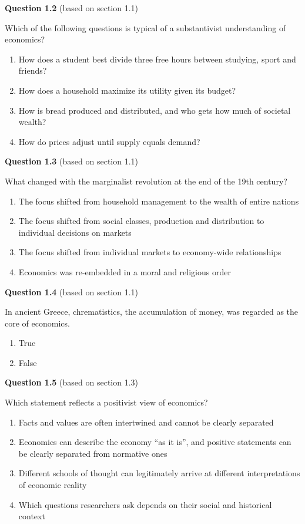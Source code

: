 \documentclass[
  british,
  a4paper,
  DIV=11,
  numbers=noendperiod,
  oneside,
  openany]{scrreprt}
\providecommand{\tightlist}{%
  \setlength{\itemsep}{0pt}\setlength{\parskip}{0pt}}
\begin{document}
\textbf{Question 1.2} (based on section 1.1)

Which of the following questions is typical of a substantivist
understanding of economics?

\begin{enumerate}
\def\labelenumi{\alph{enumi})}
\tightlist
\item
  How does a student best divide three free hours between studying,
  sport and friends?
\item
  How does a household maximize its utility given its budget?
\item
  How is bread produced and distributed, and who gets how much of
  societal wealth?
\item
  How do prices adjust until supply equals demand?
\end{enumerate}

\textbf{Question 1.3} (based on section 1.1)

What changed with the marginalist revolution at the end of the 19th
century?

\begin{enumerate}
\def\labelenumi{\alph{enumi})}
\tightlist
\item
  The focus shifted from household management to the wealth of entire
  nations
\item
  The focus shifted from social classes, production and distribution to
  individual decisions on markets
\item
  The focus shifted from individual markets to economy-wide
  relationships
\item
  Economics was re-embedded in a moral and religious order
\end{enumerate}

\textbf{Question 1.4} (based on section 1.1)

In ancient Greece, chrematistics, the accumulation of money, was
regarded as the core of economics.

\begin{enumerate}
\def\labelenumi{\alph{enumi})}
\tightlist
\item
  True
\item
  False
\end{enumerate}

\textbf{Question 1.5} (based on section 1.3)

Which statement reflects a positivist view of economics?

\begin{enumerate}
\def\labelenumi{\alph{enumi})}
\tightlist
\item
  Facts and values are often intertwined and cannot be clearly separated
\item
  Economics can describe the economy ``as it is'', and positive
  statements can be clearly separated from normative ones
\item
  Different schools of thought can legitimately arrive at different
  interpretations of economic reality
\item
  Which questions researchers ask depends on their social and historical
  context
\end{enumerate}
\end{document}
